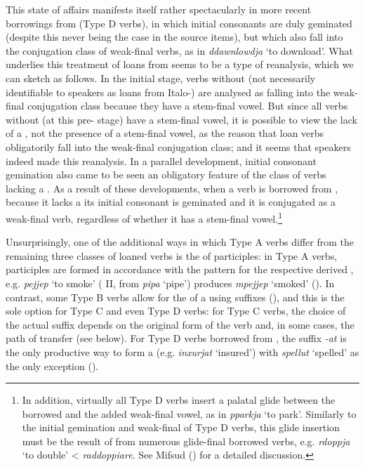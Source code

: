 \documentclass[output=paper]{langsci/langscibook}
\begin{document}
This state of affairs manifests itself rather spectacularly in more recent borrowings from  (Type D verbs), in which initial consonants are duly geminated (despite this never being the case in the  source items), but which also fall into the conjugation class of weak-final verbs, as in \textit{ddawnlowdja} `to download'. What underlies this treatment of loans from  seems to be a type of reanalysis, which we can sketch as follows. In the initial stage, verbs without  (not necessarily identifiable to speakers as loans from Italo-) are analysed as falling into the weak-final conjugation class because they have a stem-final vowel. But since all verbs without  (at this pre- stage) have a stem-final vowel, it is possible to view the lack of a , not the presence of a stem-final vowel, as the reason that loan verbs obligatorily fall into the weak-final conjugation class; and it seems that speakers indeed made this reanalysis. In a parallel development, initial consonant gemination also came to be seen an obligatory feature of the class of verbs lacking a . As a result of these developments, when a verb is borrowed from , because it lacks a  its initial consonant is geminated and it is conjugated as a weak-final verb, regardless of whether it has a stem-final vowel.\footnote{In addition, virtually all Type D verbs insert a palatal glide between the borrowed  and the added weak-final vowel, as in \textit{pparkja} `to park'. Similarly to the initial gemination and weak-final  of Type D verbs, this glide insertion must be the result of   from numerous glide-final borrowed  verbs, e.g. \textit{rdoppja} `to double' <  \textit{raddoppiare}. See Mifsud (\citeyear[225--236]{mifsudloanverbs}) for a detailed discussion.}

\label{participles}\largerpage %
Unsurprisingly, one of the additional ways in which Type A verbs differ from the remaining three classes of loaned verbs is the  of  participles: in Type A verbs,  participles are formed in accordance with the  pattern for the respective derived , e.g. \textit{pejjep} `to smoke' ( II, from  \textit{pipa} `pipe') produces \textit{mpejjep} `smoked' (\citealt[70]{mifsudloanverbs}). In contrast, some Type B verbs allow for the  of a   using  suffixes (\citealt[127--133]{mifsudloanverbs}), and this is the sole option for Type C and even Type D verbs: for Type C verbs, the choice of the actual suffix depends on the original form of the verb and, in some cases, the path of transfer (see below). For Type D verbs borrowed from , the suffix \textit{-at} is the only productive way to form a   (e.g. \textit{inxurjat} `insured') with \textit{spellut} `spelled' as the only exception (\citealt[248]{mifsudloanverbs}).
\end{document}
